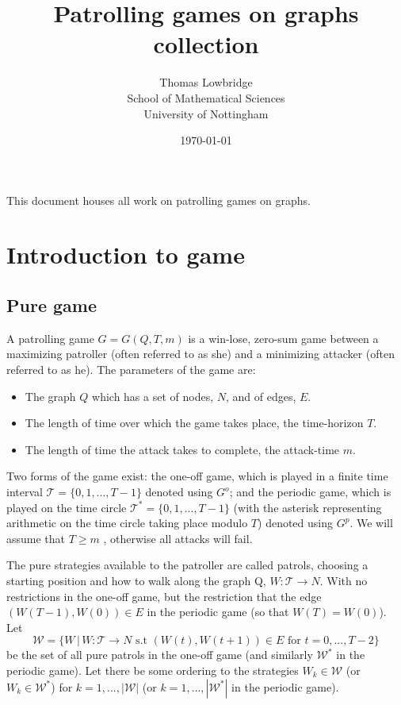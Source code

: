 \documentclass[a4paper,10pt]{article}
\title{Patrolling games on graphs collection}
\date{\today}
\author{Thomas Lowbridge \\ School of Mathematical Sciences \\ University of Nottingham}
\theoremstyle{definition}
\theoremstyle{definition}
\theoremstyle{remark}
\theoremstyle{definition}
\begin{document}
\pagestyle{empty}
{
  \renewcommand{\thispagestyle}[1]{}
  \maketitle
  This document houses all work on patrolling games on graphs.
  \tableofcontents  
}
\clearpage
\pagestyle{plain}


\setlength{\parindent}{0pt}
\setlength{\parskip}{1em}

\newpage
{}

\section{Introduction to game}
\subsection{Pure game}
A patrolling game $G=G(Q,T,m)$ is a win-lose, zero-sum game between a maximizing patroller (often referred to as she) and a minimizing attacker (often referred to as he). The parameters of the game are:
\begin{itemize}
\item The graph $Q$ which has a set of nodes, $N$,  and of edges, $E$.
\item The length of time over which the game takes place, the time-horizon $T$.
\item The length of time the attack takes to complete, the attack-time $m$.
\end{itemize}

Two forms of the game exist: the one-off game, which is played in a finite time interval $\mathcal{T}=\{0,1,...,T-1\}$ denoted using $G^{o}$; and the periodic game, which is played on the time circle $\mathcal{T}^*=\{0,1,...,T-1\}$ (with the asterisk representing arithmetic on the time circle taking place modulo $T$) denoted using $G^p$. We will assume that $T \geq m$ , otherwise all attacks will fail.

The pure strategies available to the patroller are called patrols, choosing a starting position and how to walk along the graph Q, $W:\mathcal{T} \rightarrow N$. With no restrictions in the one-off game, but the restriction that the edge $(W(T-1),W(0)) \in E$ in the periodic game (so that $W(T)=W(0)$). Let $$\mathcal{W}=\{ W \, | \, W:\mathcal{T} \rightarrow N \text{ s.t } (W(t),W(t+1)) \in E \text{ for } t=0,...,T-2  \} $$ be the set of all pure patrols in the one-off game (and similarly $\mathcal{W}^*$ in the periodic game). Let there be some ordering to the strategies $W_{k} \in \mathcal{W}$ (or $W_{k} \in \mathcal{W}^{*}$) for $k=1,...,|\mathcal{W}|$ (or $k=1,...,|\mathcal{W}^*|$ in the periodic game).
\end{document}
